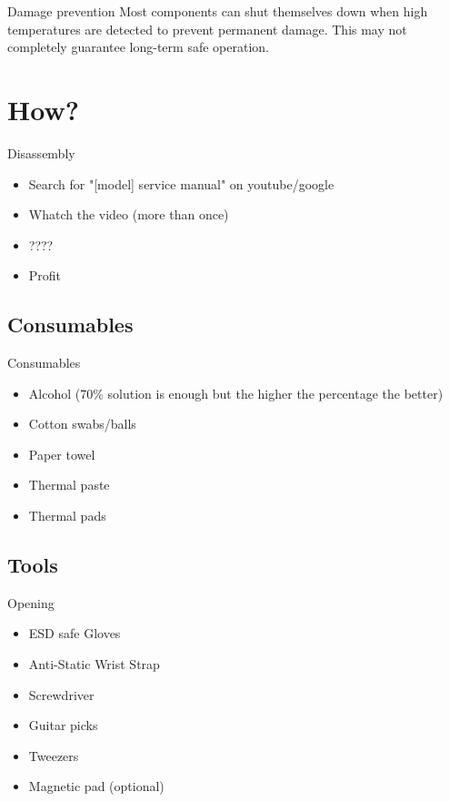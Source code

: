 \documentclass{beamer}
\begin{document}
\begin{frame}{Damage prevention}
    Most components can shut themselves down when high temperatures are detected to prevent permanent damage.
    \newline
    \newline
    This may not completely guarantee long-term safe operation.
\end{frame}

\section{How?}

\begin{frame}{Disassembly}
    \begin{itemize}
        \item Search for "[model] service manual" on youtube/google
        \item Whatch the video (more than once)
        \item ????
        \item Profit
    \end{itemize}
\end{frame}

\subsection{Consumables}

\begin{frame}{Consumables}
    \begin{itemize}
      \item Alcohol (70\% solution is enough but the higher the percentage the better)
      \item Cotton swabs/balls
      \item Paper towel
      \item Thermal paste
      \item Thermal pads
    \end{itemize}
\end{frame}

\subsection{Tools}

\begin{frame}{Opening}
    \begin{itemize}
        \item ESD safe Gloves
        \item Anti-Static Wrist Strap
        \item Screwdriver
        \item Guitar picks
        \item Tweezers
        \item Magnetic pad (optional)
    \end{itemize}
\end{frame}
\end{document}
